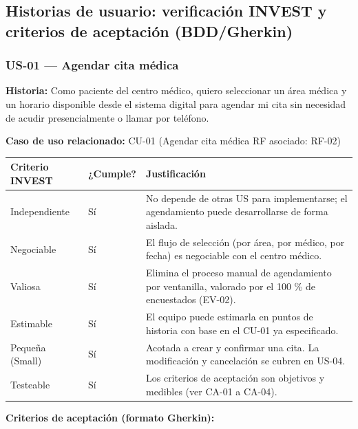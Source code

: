\documentclass[11pt,a4paper]{article}
\begin{document}
	
	\subsection{ Historias de usuario: verificación INVEST y criterios de aceptación (BDD/Gherkin)}
	
	\subsubsection{US-01 --- Agendar cita médica}
	
	\textbf{Historia:} Como paciente del centro médico, quiero seleccionar un área médica y un horario disponible desde el sistema digital para agendar mi cita sin necesidad de acudir presencialmente o llamar por teléfono.
	
	\textbf{Caso de uso relacionado:} CU-01 (Agendar cita médica \textbar{} RF asociado: RF-02)
	
	\begin{longtable}{p{} p{} p{}}
		
		
		\toprule
		\textbf{Criterio INVEST} &
		\textbf{¿Cumple?} &
		\textbf{Justificación} \\
		\midrule
		\endhead
		
		Independiente & Sí & No depende de otras US para implementarse; el agendamiento puede desarrollarse de forma aislada. \\
		Negociable & Sí & El flujo de selección (por área, por médico, por fecha) es negociable con el centro médico. \\
		Valiosa & Sí & Elimina el proceso manual de agendamiento por ventanilla, valorado por el 100 \% de encuestados (EV-02). \\
		Estimable & Sí & El equipo puede estimarla en puntos de historia con base en el CU-01 ya especificado. \\
		Pequeña (Small) & Sí & Acotada a crear y confirmar una cita. La modificación y cancelación se cubren en US-04. \\
		Testeable & Sí & Los criterios de aceptación son objetivos y medibles (ver CA-01 a CA-04). \\
		
		\bottomrule
	\end{longtable}
	
	\textbf{Criterios de aceptación (formato Gherkin):}
	
\end{document}
